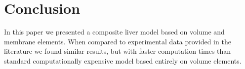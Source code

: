 \section{Conclusion}
In this paper we presented a composite liver model based on volume and membrane elements. 
When compared to experimental data provided in the literature we found similar results, but with faster computation times than standard computationally expensive model based entirely on volume elements.



